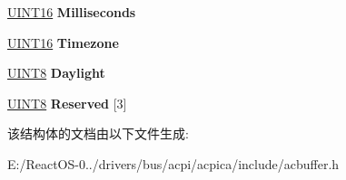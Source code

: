 \begin{DoxyCompactItemize}
\mbox{\label{structacpi__grt__info_a70ff82f7861137e103f3b9fe53fe5981}} 
\hyperlink{_processor_bind_8h_a09f1a1fb2293e33483cc8d44aefb1eb1}{U\+I\+N\+T16} {\bfseries Milliseconds}
\item 
\mbox{\label{structacpi__grt__info_abaa379ac08a79fc8b6ec766416a08143}} 
\hyperlink{_processor_bind_8h_a09f1a1fb2293e33483cc8d44aefb1eb1}{U\+I\+N\+T16} {\bfseries Timezone}
\item 
\mbox{\label{structacpi__grt__info_a43ed9faea6bdeb846dee759119f42829}} 
\hyperlink{_processor_bind_8h_ab27e9918b538ce9d8ca692479b375b6a}{U\+I\+N\+T8} {\bfseries Daylight}
\item 
\mbox{\label{structacpi__grt__info_aa0906a5ce5bdfa6f352ffbbdc1f22c40}} 
\hyperlink{_processor_bind_8h_ab27e9918b538ce9d8ca692479b375b6a}{U\+I\+N\+T8} {\bfseries Reserved} \mbox{[}3\mbox{]}
\end{DoxyCompactItemize}


该结构体的文档由以下文件生成\+:\begin{DoxyCompactItemize}
\item 
E\+:/\+React\+O\+S-\/0../drivers/bus/acpi/acpica/include/acbuffer.\+h\end{DoxyCompactItemize}
